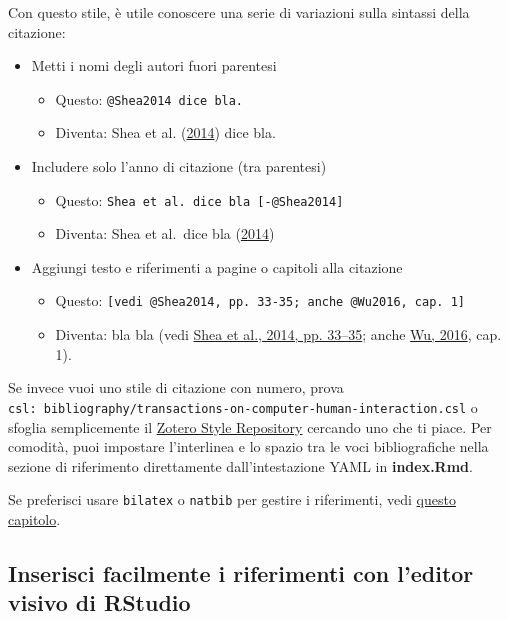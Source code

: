 \documentclass[a4paper, 11pt, nobind]{templates/ociamthesis}
\providecommand{\tightlist}{%
  \setlength{\itemsep}{0pt}\setlength{\parskip}{0pt}}
\begin{document}
Con questo stile, è utile conoscere una serie di variazioni sulla sintassi della citazione:

\begin{itemize}
\tightlist
\item
  Metti i nomi degli autori fuori parentesi

  \begin{itemize}
  \tightlist
  \item
    Questo: \texttt{@Shea2014\ dice\ bla.}
  \item
    Diventa: Shea et al. (\protect\hyperlink{ref-Shea2014}{2014}) dice bla.
  \end{itemize}
\item
  Includere solo l'anno di citazione (tra parentesi)

  \begin{itemize}
  \tightlist
  \item
    Questo: \texttt{Shea\ et\ al.\ dice\ bla\ {[}-@Shea2014{]}}
  \item
    Diventa: Shea et al.~dice bla (\protect\hyperlink{ref-Shea2014}{2014})
  \end{itemize}
\item
  Aggiungi testo e riferimenti a pagine o capitoli alla citazione

  \begin{itemize}
  \tightlist
  \item
    Questo: \texttt{{[}vedi\ @Shea2014,\ pp.\ 33-35;\ anche\ @Wu2016,\ cap.\ 1{]}}
  \item
    Diventa: bla bla (vedi \protect\hyperlink{ref-Shea2014}{Shea et al., 2014, pp. 33--35}; anche \protect\hyperlink{ref-Wu2016}{Wu, 2016}, cap. 1).
  \end{itemize}
\end{itemize}

Se invece vuoi uno stile di citazione con numero, prova \texttt{csl:\ bibliography/transactions-on-computer-human-interaction.csl} o sfoglia semplicemente il \href{https://www.zotero.org/\%20stili}{Zotero Style Repository} cercando uno che ti piace.
Per comodità, puoi impostare l'interlinea e lo spazio tra le voci bibliografiche nella sezione di riferimento direttamente dall'intestazione YAML in \textbf{index.Rmd}.

Se preferisci usare \texttt{bilatex} o \texttt{natbib} per gestire i riferimenti, vedi \protect\hyperlink{customising-citations}{questo capitolo}.
\clearpage

\hypertarget{inserisci-facilmente-i-riferimenti-con-leditor-visivo-di-rstudio}{%
\subsection{Inserisci facilmente i riferimenti con l'editor visivo di RStudio}\label{inserisci-facilmente-i-riferimenti-con-leditor-visivo-di-rstudio}}
\end{document}
